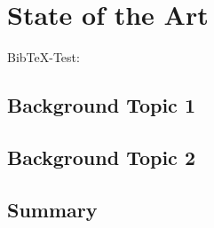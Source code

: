 \chapter{State of the Art}
\label{ch:background}
Bib\TeX-Test: \cite{Steinmetz2005} \citeauthor{Steinmetz2005} \citep{Steinmetz2005}

\section{Background Topic 1}

\section{Background Topic 2}

\section{Summary}